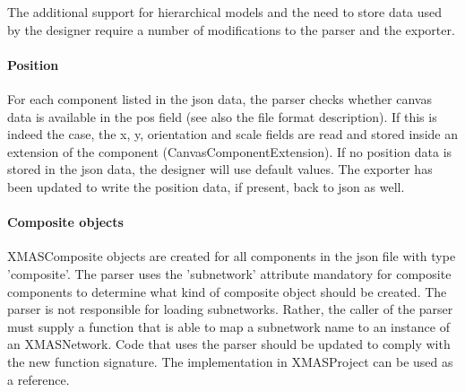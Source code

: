 The additional support for hierarchical models and the need to store data used
by the designer require a number of modifications to the parser and the exporter.

\paragraph{Position}
For each component listed in the json data, the parser checks whether canvas data
is available in the pos field (see also the file format description). If this is
indeed the case, the x, y, orientation and scale fields are read and stored inside
an extension of the component (CanvasComponentExtension). If no position data
is stored in the json data, the designer will use default values. The exporter has
been updated to write the position data, if present, back to json as well.

\paragraph{Composite objects}
XMASComposite objects are created for all components in the json file with type
'composite'. The parser uses the 'subnetwork' attribute mandatory for composite
components to determine what kind of composite object should be created. The
parser is not responsible for loading subnetworks. Rather, the caller of the parser
must supply a function that is able to map a subnetwork name to an instance of
an XMASNetwork. Code that uses the parser should be updated to comply with the
new function signature. The implementation in XMASProject can be used as a reference.


\newpage

